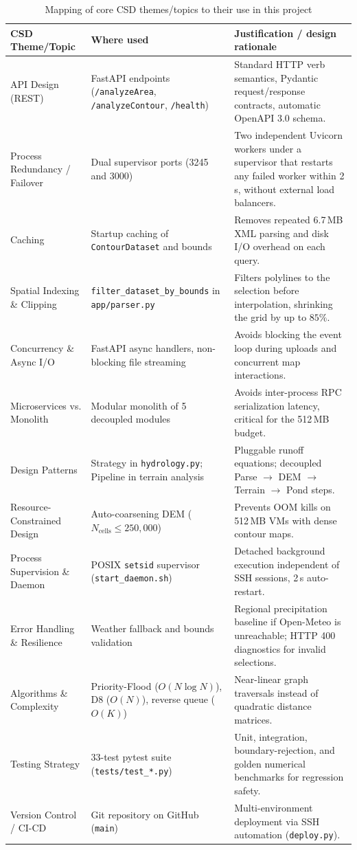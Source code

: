 \documentclass[manuscript,screen,review]{acmart}
\begin{document}
\begin{table}[!t]
\small
  \caption{Mapping of core CSD themes/topics to their use in this project}
  \label{tab:csd-themes}
  \begin{tabular}{p{3.2cm}p{4.8cm}p{6.8cm}}
    \toprule
    \textbf{CSD Theme/Topic} & \textbf{Where used} & \textbf{Justification / design rationale} \\
    \midrule
    API Design (REST) & FastAPI endpoints (\texttt{/analyzeArea}, \texttt{/analyzeContour}, \texttt{/health}) & Standard HTTP verb semantics, Pydantic request/response contracts, automatic OpenAPI 3.0 schema. \\
    Process Redundancy / Failover & Dual supervisor ports (3245 and 3000) & Two independent Uvicorn workers under a supervisor that restarts any failed worker within 2\,s, without external load balancers. \\
    Caching & Startup caching of \texttt{ContourDataset} and bounds & Removes repeated 6.7\,MB XML parsing and disk I/O overhead on each query. \\
    Spatial Indexing \& Clipping & \texttt{filter\_dataset\_by\_bounds} in \texttt{app/parser.py} & Filters polylines to the selection before interpolation, shrinking the grid by up to $85\%$. \\
    Concurrency \& Async I/O & FastAPI async handlers, non-blocking file streaming & Avoids blocking the event loop during uploads and concurrent map interactions. \\
    Microservices vs. Monolith & Modular monolith of 5 decoupled modules & Avoids inter-process RPC serialization latency, critical for the 512\,MB budget. \\
    Design Patterns & Strategy in \texttt{hydrology.py}; Pipeline in terrain analysis & Pluggable runoff equations; decoupled Parse $\rightarrow$ DEM $\rightarrow$ Terrain $\rightarrow$ Pond steps. \\
    Resource-Constrained Design & Auto-coarsening DEM ($N_{\text{cells}} \le 250,000$) & Prevents OOM kills on 512\,MB VMs with dense contour maps. \\
    Process Supervision \& Daemon & POSIX \texttt{setsid} supervisor (\texttt{start\_daemon.sh}) & Detached background execution independent of SSH sessions, 2\,s auto-restart. \\
    Error Handling \& Resilience & Weather fallback and bounds validation & Regional precipitation baseline if Open-Meteo is unreachable; HTTP 400 diagnostics for invalid selections. \\
    Algorithms \& Complexity & Priority-Flood ($O(N \log N)$), D8 ($O(N)$), reverse queue ($O(K)$) & Near-linear graph traversals instead of quadratic distance matrices. \\
    Testing Strategy & 33-test pytest suite (\texttt{tests/test\_*.py}) & Unit, integration, boundary-rejection, and golden numerical benchmarks for regression safety. \\
    Version Control / CI-CD & Git repository on GitHub (\texttt{main}) & Multi-environment deployment via SSH automation (\texttt{deploy.py}). \\
    \bottomrule
  \end{tabular}
\end{table}
\end{document}
